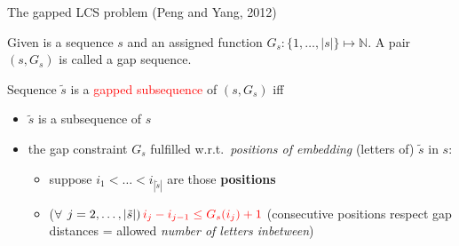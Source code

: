 \documentclass{beamer}
\begin{document}
\begin{frame}{The gapped LCS problem (Peng and Yang, 2012)}
   \begin{definition}
       Given is a sequence $s$ and an assigned function 
       $G_s \colon \{1, \ldots, |s|\} \mapsto \mathbb{N}$. A pair $(s, G_s)$ is called a {gap sequence}.
   \end{definition} \vspace{0.5cm}
   
   \begin{definition}
         Sequence $\tilde{s}$ is a \textcolor{red}{gapped subsequence} of $(s, G_s)$ iff 
         \begin{itemize}
             \item $\tilde{s}$ is a subsequence of $s$
             \item the gap constraint $G_s$ fulfilled w.r.t.\ \textit{positions of embedding} (letters of) $\tilde{s}$ in $s$:
         \begin{itemize}
             \item  suppose $i_1< \ldots <i_{|\tilde{s}|}$ are those \textbf{positions}  
             \item ($\forall$ $j=2, \ldots, |\tilde{s}|)\, \textcolor{red}{i_{j} - i_{j-1} \leq G_{s}(i_{j})+1}$  (consecutive positions respect gap distances = allowed \textit{number of letters inbetween})
         \end{itemize}
       \end{itemize}
   \end{definition}
   
\end{frame}
\end{document}
